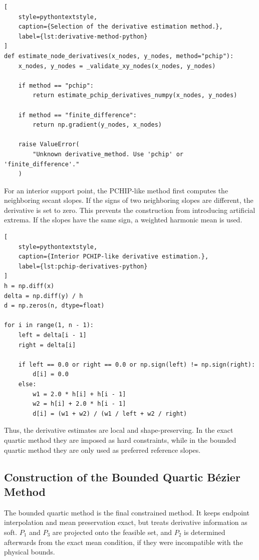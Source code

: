 \documentclass[12pt,a4paper]{article}
\begin{document}
\begin{lstlisting}[
    style=pythontextstyle,
    caption={Selection of the derivative estimation method.},
    label={lst:derivative-method-python}
]
def estimate_node_derivatives(x_nodes, y_nodes, method="pchip"):
    x_nodes, y_nodes = _validate_xy_nodes(x_nodes, y_nodes)

    if method == "pchip":
        return estimate_pchip_derivatives_numpy(x_nodes, y_nodes)

    if method == "finite_difference":
        return np.gradient(y_nodes, x_nodes)

    raise ValueError(
        "Unknown derivative_method. Use 'pchip' or 'finite_difference'."
    )
\end{lstlisting}

For an interior support point, the PCHIP-like method first computes the
neighboring secant slopes. If the signs of two neighboring slopes are
different, the derivative is set to zero. This prevents the construction from
introducing artificial extrema. If the slopes have the same sign, a weighted
harmonic mean is used.

\begin{lstlisting}[
    style=pythontextstyle,
    caption={Interior PCHIP-like derivative estimation.},
    label={lst:pchip-derivatives-python}
]
h = np.diff(x)
delta = np.diff(y) / h
d = np.zeros(n, dtype=float)

for i in range(1, n - 1):
    left = delta[i - 1]
    right = delta[i]

    if left == 0.0 or right == 0.0 or np.sign(left) != np.sign(right):
        d[i] = 0.0
    else:
        w1 = 2.0 * h[i] + h[i - 1]
        w2 = h[i] + 2.0 * h[i - 1]
        d[i] = (w1 + w2) / (w1 / left + w2 / right)
\end{lstlisting}

Thus, the derivative estimates are local and shape-preserving. In the exact
quartic method they are imposed as hard constraints, while in the bounded
quartic method they are only used as preferred reference slopes.

\subsection{Construction of the Bounded Quartic B\'ezier Method}

The bounded quartic method is the final constrained method. It keeps endpoint interpolation and mean preservation exact, but treats derivative information as soft. \(P_1\) and \(P_3\) are projected onto the
feasible set, and \(P_2\) is determined afterwards from the exact mean
condition, if they were incompatible with the
physical bounds.
\end{document}
